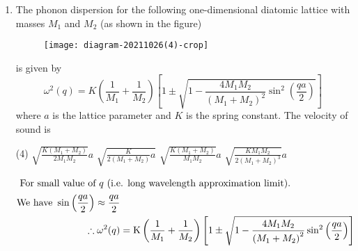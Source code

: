 \begin{enumerate}
	{}
	\begin{tasks}(4)
		\task[\textbf{A.}] $\left(\frac{12 \pi^{2}}{a^{3}}\right)^{1 / 3}$
		\task[\textbf{B.}] $\left(\frac{3 \pi^{2}}{a^{3}}\right)^{1 / 3}$
		\task[\textbf{C.}] $\left(\frac{\pi^{2}}{a^{3}}\right)^{1 / 3}$
		\task[\textbf{D.}] $\frac{1}{a}$
	\end{tasks}
	\begin{answer}
		\begin{align*}
		\text{Radius of Fermi sphere is }k_{F}&=\left(\frac{3 \pi^{2} N}{V}\right)^{1 / 3}, E_{F}=\left(\frac{\hbar^{2}}{2 m}\right)\left(3 \pi^{2} n\right)^{2 / 3}=\left(\frac{\hbar^{2} k_{F}^{2}}{2 m}\right)\\
		\text{For fcc solid }\frac{N}{V}&=\frac{4}{a^{3}} \Rightarrow k_{F}=\left(\frac{12 \pi^{2}}{a^{3}}\right)^{1 / 3}
		\end{align*}
		So the correct answer is \textbf{Option (A)}
	\end{answer}
	\item The phonon dispersion for the following one-dimensional diatomic lattice with masses $M_{1}$ and $M_{2}$ (as shown in the figure)\\
	\begin{figure}[H]
		\centering
		\texttt{[image: diagram-20211026(4)-crop]}
	\end{figure}
	is given by
	$$
	\omega^{2}(q)=K\left(\frac{1}{M_{1}}+\frac{1}{M_{2}}\right)\left[1 \pm \sqrt{1-\frac{4 M_{1} M_{2}}{\left(M_{1}+M_{2}\right)^{2}} \sin ^{2}\left(\frac{q a}{2}\right)}\right]
	$$
	where $a$ is the lattice parameter and $K$ is the spring constant. The velocity of sound is
	{}
	\begin{tasks}(4)
		\task[\textbf{A.}] $\sqrt{\frac{K\left(M_{1}+M_{2}\right)}{2 M_{1} M_{2}}} a$
		\task[\textbf{B.}] $\sqrt{\frac{K}{2\left(M_{1}+M_{2}\right)} a}$
		\task[\textbf{C.}] $\sqrt{\frac{K\left(M_{1}+M_{2}\right)}{M_{1} M_{2}}} a$
		\task[\textbf{D.}] $\sqrt{\frac{K M_{1} M_{2}}{2\left(M_{1}+M_{2}\right)^{3}}} a$
	\end{tasks}
	\begin{answer}
		\begin{align*}
		\intertext{	For small value of $q$ (i.e. long wavelength approximation limit).}
		\text{We have }\sin \left(\frac{q a}{2}\right) \approx \frac{q a}{2}\\
		\therefore \omega^{2}(q)&=\mathrm{K}\left(\frac{1}{M_{1}}+\frac{1}{M_{2}}\right)\left[1 \pm \sqrt{1-\frac{4 M_{1} M_{2}}{\left(M_{1}+M_{2}\right)^{2}} \sin ^{2}\left(\frac{q a}{2}\right)}\right]\\

\end{align*}
\end{answer}
\end{enumerate}
